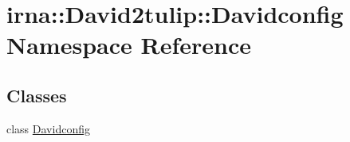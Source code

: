 \hypertarget{namespaceirna_1_1David2tulip_1_1Davidconfig}{
\section{irna\-:\-:\-David2tulip\-:\-:\-Davidconfig \-Namespace \-Reference}
\label{namespaceirna_1_1David2tulip_1_1Davidconfig}
}
\subsection*{\-Classes}
\begin{DoxyCompactItemize}
\item 
class \hyperlink{classirna_1_1David2tulip_1_1Davidconfig_1_1Davidconfig}{\-Davidconfig}
\end{DoxyCompactItemize}
